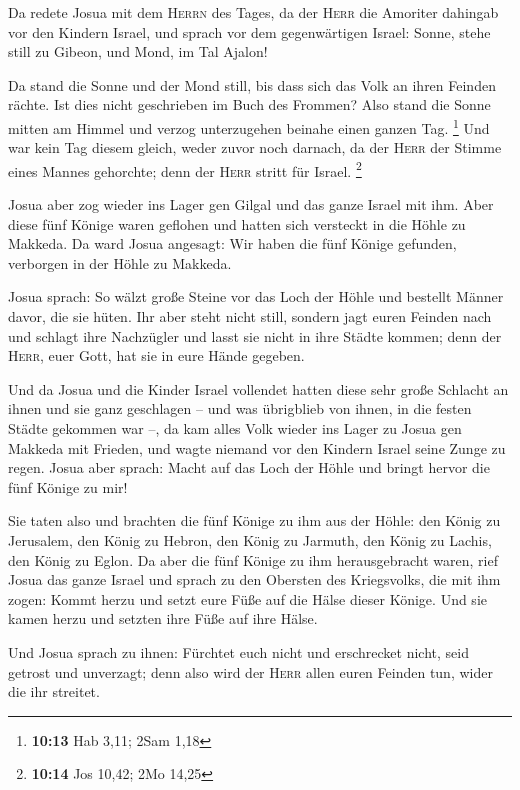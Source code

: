  Da redete Josua mit dem \textsc{Herrn} des Tages, da der
\textsc{Herr} die Amoriter dahingab vor den Kindern Israel, und sprach
vor dem gegenwärtigen Israel: Sonne, stehe still zu Gibeon, und Mond, im
Tal Ajalon!

 Da stand die Sonne und der Mond still, bis dass sich das
Volk an ihren Feinden rächte. Ist dies nicht geschrieben im Buch des
Frommen? Also stand die Sonne mitten am Himmel und verzog unterzugehen
beinahe einen ganzen Tag. \footnote{\textbf{10:13} Hab 3,11; 2Sam 1,18}
 Und war kein Tag diesem gleich, weder zuvor noch
darnach, da der \textsc{Herr} der Stimme eines Mannes gehorchte; denn
der \textsc{Herr} stritt für Israel. \footnote{\textbf{10:14} Jos 10,42;
  2Mo 14,25}

 Josua aber zog wieder ins Lager gen Gilgal und das ganze
Israel mit ihm.  Aber diese fünf Könige waren geflohen
und hatten sich versteckt in die Höhle zu Makkeda.  Da
ward Josua angesagt: Wir haben die fünf Könige gefunden, verborgen in
der Höhle zu Makkeda.

 Josua sprach: So wälzt große Steine vor das Loch der
Höhle und bestellt Männer davor, die sie hüten.  Ihr aber
steht nicht still, sondern jagt euren Feinden nach und schlagt ihre
Nachzügler und lasst sie nicht in ihre Städte kommen; denn der
\textsc{Herr}, euer Gott, hat sie in eure Hände gegeben.

 Und da Josua und die Kinder Israel vollendet hatten
diese sehr große Schlacht an ihnen und sie ganz geschlagen -- und was
übrigblieb von ihnen, in die festen Städte gekommen war --,
 da kam alles Volk wieder ins Lager zu Josua gen Makkeda
mit Frieden, und wagte niemand vor den Kindern Israel seine Zunge zu
regen.  Josua aber sprach: Macht auf das Loch der Höhle
und bringt hervor die fünf Könige zu mir!

 Sie taten also und brachten die fünf Könige zu ihm aus
der Höhle: den König zu Jerusalem, den König zu Hebron, den König zu
Jarmuth, den König zu Lachis, den König zu Eglon.  Da
aber die fünf Könige zu ihm herausgebracht waren, rief Josua das ganze
Israel und sprach zu den Obersten des Kriegsvolks, die mit ihm zogen:
Kommt herzu und setzt eure Füße auf die Hälse dieser Könige. Und sie
kamen herzu und setzten ihre Füße auf ihre Hälse.

 Und Josua sprach zu ihnen: Fürchtet euch nicht und
erschrecket nicht, seid getrost und unverzagt; denn also wird der
\textsc{Herr} allen euren Feinden tun, wider die ihr streitet.

